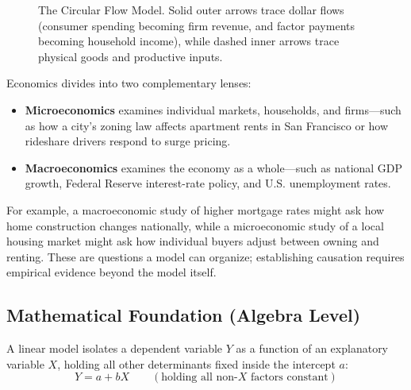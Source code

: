 \documentclass[11pt,letterpaper]{article}
\begin{document}
\begin{figure}[htbp]
\caption{The Circular Flow Model. Solid outer arrows trace dollar flows (consumer spending becoming firm revenue, and factor payments becoming household income), while dashed inner arrows trace physical goods and productive inputs.}
\label{fig:circular_flow}
\end{figure}

\begin{tcolorbox}[colback=CourseTeal!8!white,colframe=CourseTeal!80!black,title=\textbf{Bring It Home: Separating Micro from Macro in Housing Policy}]
Economics divides into two complementary lenses:
\begin{itemize}
    \item \textbf{Microeconomics} examines individual markets, households, and firms—such as how a city's zoning law affects apartment rents in San Francisco or how rideshare drivers respond to surge pricing.
    \item \textbf{Macroeconomics} examines the economy as a whole—such as national GDP growth, Federal Reserve interest-rate policy, and U.S. unemployment rates.
\end{itemize}
For example, a macroeconomic study of higher mortgage rates might ask how home construction changes nationally, while a microeconomic study of a local housing market might ask how individual buyers adjust between owning and renting. These are questions a model can organize; establishing causation requires empirical evidence beyond the model itself.
\end{tcolorbox}

\subsection*{Mathematical Foundation (Algebra Level)}
A linear model isolates a dependent variable $Y$ as a function of an explanatory variable $X$, holding all other determinants fixed inside the intercept $a$:
\begin{equation}
Y = a + bX \qquad (\text{holding all non-}X\text{ factors constant})
\end{equation}
\end{document}
